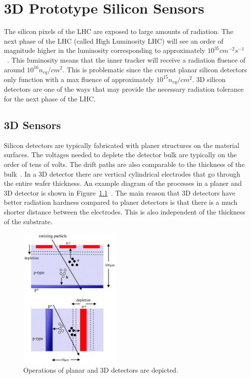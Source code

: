 \chapter{3D Prototype Silicon Sensors}

The silicon pixels of the LHC are exposed to large amounts of radiation.  The next phase of the LHC (called High Luminosity LHC) will see an order of magnitude higher in the luminosity corresponding to approximately $10^{35} cm ^{-2}s^{-1}$~\cite{SuperLHC}. This luminosity means that the inner tracker will receive a radiation fluence of around $10^{16}n_{eq}/cm^2$.  This is problematic since the current planar silicon detectors only function with a max fluence of approximately $10^{15}n_{eq}/cm^2$.  3D silicon detectors are one of the ways that may provide the necessary radiation tolerance for the next phase of the LHC.

\section{3D Sensors}

Silicon detectors are typically fabricated with planer structures on the material surfaces.  The voltages needed to deplete the detector bulk are typically on the order of tens of volts.  The drift paths are also comparable to the thickness of the bulk~\cite{3dsilicon}. In a 3D detector there are vertical cylindrical electrodes that go through the entire wafer thickness. An example diagram of the processes in a planer and 3D detector is shown in Figure~\ref{fig:operations_3d}~\cite{5734879}. The main reason that 3D detectors have better radiation hardness compared to planer detectors is that there is a much shorter distance between the electrodes.  This is also independent of the thickness of the substrate.  


\begin{figure}[htb!]
\begin{center}
\centerline{
\includegraphics[width=0.45\textwidth]{3D/processes.pdf}
}
\caption{Operations of planar and 3D detectors are depicted.~\cite{5734879} }
\label{fig:operations_3d}
\end{center}
\end{figure}

